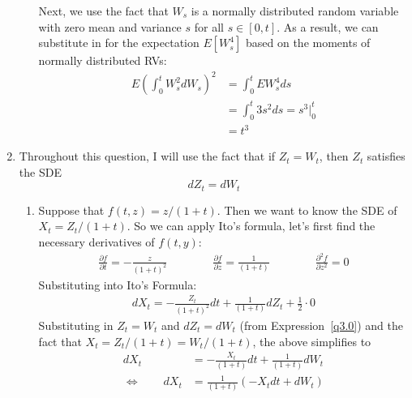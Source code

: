 \documentclass[12pt]{article}
\theoremstyle{plain}
\theoremstyle{definition}
\theoremstyle{remark}
\begin{document}
\begin{enumerate}
\begin{enumerate}
        Next, we use the fact that $W_s$ is a normally distributed
        random variable with zero mean and variance $s$ for all
        $s\in[0,t]$. As a result, we can substitute in for the
        expectation $E[W_s^4]$ based on the moments of normally
        distributed RVs:
        \begin{align*}
          E\left(\int^t_0 W_s^2 dW_s\right)^2
          &= \int^t_0 EW_s^4 ds\\
          &= \int^t_0 3s^2 ds = s^3|^t_0\\
          &= t^3
        \end{align*}

    \end{enumerate}

  \item %
    Throughout this question, I will use the fact that if $Z_t = W_t$,
    then $Z_t$ satisfies the SDE
    \begin{equation}
      dZ_t = dW_t
      \label{q3.0}
    \end{equation}
    \begin{enumerate}
      \item %
        Suppose that $f(t,z) = z/(1+t)$. Then we want to know the SDE of
        $X_t=Z_t/(1+t)$.  So we can apply Ito's formula, let's first
        find the necessary derivatives of $f(t,y)$:
        \begin{align*}
          \frac{\partial f}{\partial t} = -\frac{z}{(1+t)^2} \qquad\qquad
          \frac{\partial f}{\partial z} = \frac{1}{(1+t)}\qquad\qquad
          \frac{\partial^2 f}{\partial z^2} = 0
        \end{align*}
        Substituting into Ito's Formula:
        \begin{align*}
          dX_t = - \frac{Z_t}{(1+t)^2} dt
          + \frac{1}{(1+t)} dZ_t + \frac{1}{2}\cdot 0
        \end{align*}
        Substituting in $Z_t=W_t$ and $dZ_t=dW_t$ (from
        Expression~\ref{q3.0}) and the fact that $X_t =
        Z_t/(1+t)=W_t/(1+t)$, the above simplifies to
        \begin{align*}
          dX_t &= - \frac{X_t}{(1+t)} dt + \frac{1}{(1+t)} dW_t \\
          \Leftrightarrow \qquad
          dX_t&= \frac{1}{(1+t)} (-X_t dt + dW_t)
        \end{align*}


\end{enumerate}
\end{enumerate}
\end{document}
